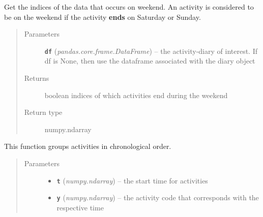 \documentclass[letterpaper,10pt,english]{sphinxmanual}
\begin{document}
\begin{fulllineitems}
\begin{fulllineitems}
\begin{quote}
\begin{description}
\end{description}\end{quote}

\end{fulllineitems}


\begin{fulllineitems}
\label{diary:diary.Diary.get_weekend_idx}
Get the indices of the data that occurs on weekend. An activity is considered to be on the weekend if         the activity \textbf{ends} on Saturday or Sunday.
\begin{quote}\begin{description}
\item[{Parameters}] \leavevmode
\textbf{\texttt{df}} (\emph{pandas.core.frame.DataFrame}) -- the activity-diary of interest. If df is None, then use the dataframe         associated with the diary object

\item[{Returns}] \leavevmode
boolean indices of which activities end during the weekend

\item[{Return type}] \leavevmode
numpy.ndarray

\end{description}\end{quote}

\end{fulllineitems}


\begin{fulllineitems}
\label{diary:diary.Diary.group_activity}
This function groups activities in chronological order.
\begin{quote}\begin{description}
\item[{Parameters}] \leavevmode\begin{itemize}
\item {} 
\textbf{\texttt{t}} (\emph{numpy.ndarray}) -- the start time for activities

\item {} 
\textbf{\texttt{y}} (\emph{numpy.ndarray}) -- the activity code that corresponds with the respective time

\end{itemize}


\end{description}
\end{quote}
\end{fulllineitems}
\end{fulllineitems}
\end{document}
